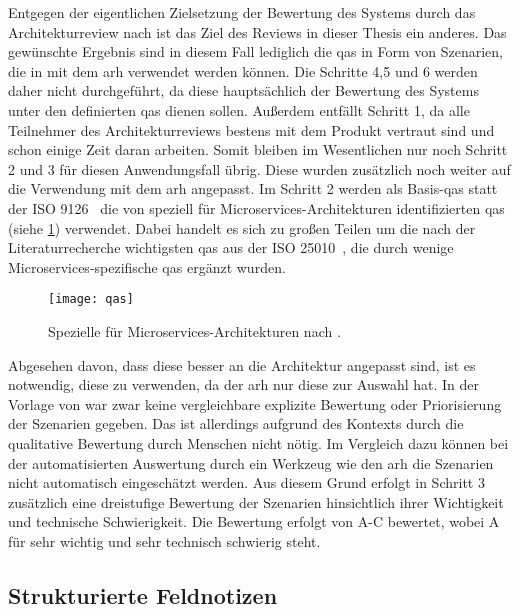 Entgegen der eigentlichen Zielsetzung der Bewertung des Systems durch das Architekturreview nach  ist das Ziel des Reviews in dieser Thesis ein anderes.
Das gewünschte Ergebnis sind in diesem Fall lediglich die \glspl{qa} in Form von Szenarien, die in mit dem \gls{arh} verwendet werden können.
Die Schritte 4,5 und 6 werden daher nicht durchgeführt, da diese hauptsächlich der Bewertung des Systems unter den definierten \glspl{qa} dienen sollen.
Außerdem entfällt Schritt 1, da alle Teilnehmer des Architekturreviews bestens mit dem Produkt vertraut sind und schon einige Zeit daran arbeiten.
Somit bleiben im Wesentlichen nur noch Schritt 2 und 3 für diesen Anwendungsfall übrig.
Diese wurden zusätzlich noch weiter auf die Verwendung mit dem \gls{arh} angepasst.
Im Schritt 2 werden als Basis-\glspl{qa} statt der ISO 9126~\cite{ISO-9126} die von  speziell für Microservices-Architekturen identifizierten \glspl{qa} (siehe \cref{fig:qas}) verwendet.
Dabei handelt es sich zu großen Teilen um die nach der Literaturrecherche wichtigsten \glspl{qa} aus der ISO 25010~\cite{ISO-25010}, die durch wenige Microservices-spezifische \glspl{qa} ergänzt wurden.
\begin{figure}
	\centering
	\texttt{[image: qas]}
	\caption[Spezielle  für Microservices-Architekturen]{
		Spezielle  für Microservices-Architekturen nach .
	}
	\label{fig:qas}
\end{figure}
Abgesehen davon, dass diese besser an die Architektur angepasst sind, ist es notwendig, diese zu verwenden, da der \gls{arh} nur diese zur Auswahl hat.
In der Vorlage von  war zwar keine vergleichbare explizite Bewertung oder Priorisierung der Szenarien gegeben.
Das ist allerdings aufgrund des Kontexts durch die qualitative Bewertung durch Menschen nicht nötig.
Im Vergleich dazu können bei der automatisierten Auswertung durch ein Werkzeug wie den \gls{arh} die Szenarien nicht automatisch eingeschätzt werden.
Aus diesem Grund erfolgt in Schritt 3 zusätzlich eine dreistufige Bewertung der Szenarien hinsichtlich ihrer Wichtigkeit und technische Schwierigkeit.
Die Bewertung erfolgt von A-C bewertet, wobei A für sehr wichtig und sehr technisch schwierig steht.

\subsection{Strukturierte Feldnotizen}
\label{sec:structured-field-notes}

